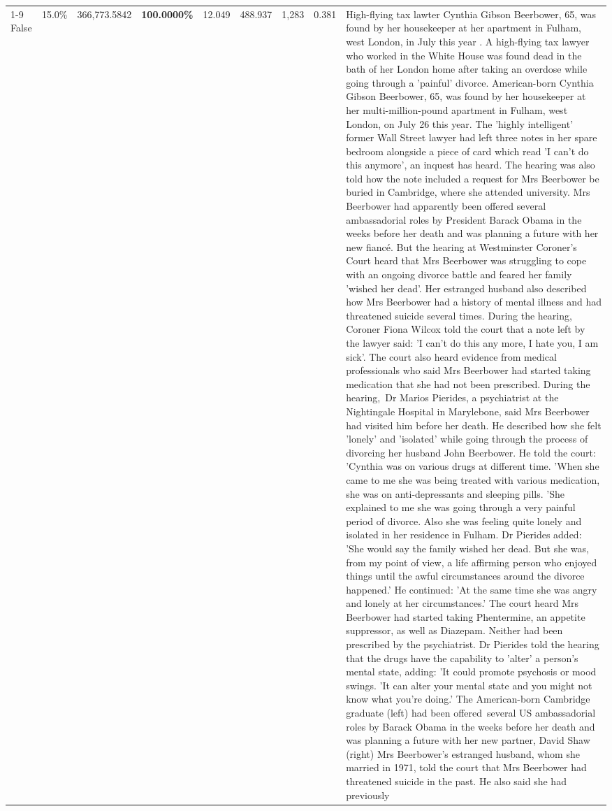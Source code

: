 \begin{table}[H]
\begin{tabular}{lllrlllll}
\cline{1-9}
False & 15.0\% & 366,773.5842 & \bfseries \color{red} 100.0000\% & 12.049 & 488.937 & 1,283 & 0.381 & High-flying tax lawter Cynthia Gibson Beerbower, 65, was found by her housekeeper at her apartment in Fulham, west London, in July this year . A high-flying tax lawyer who worked in the White House was found dead in the bath of her London home after taking an overdose while going through a 'painful' divorce. American-born Cynthia Gibson Beerbower, 65, was found by her housekeeper at her multi-million-pound apartment in Fulham, west London, on July 26 this year. The 'highly intelligent' former Wall Street lawyer had left three notes in her spare bedroom alongside a piece of card which read 'I can't do this anymore', an inquest has heard. The hearing was also told how the note included a request for Mrs Beerbower be buried in Cambridge, where she attended university. Mrs Beerbower had apparently been offered several ambassadorial roles by President Barack Obama in the weeks before her death and was planning a future with her new fiancé. But the hearing at Westminster Coroner's Court heard that Mrs Beerbower was struggling to cope with an ongoing divorce battle and feared her family 'wished her dead'. Her estranged husband also described how Mrs Beerbower had a history of mental illness and had threatened suicide several times. During the hearing, Coroner Fiona Wilcox told the court that a note left by the lawyer said: 'I can't do this any more, I hate you, I am sick'. The court also heard evidence from medical professionals who said Mrs Beerbower had started taking medication that she had not been prescribed. During the hearing, Dr Marios Pierides, a psychiatrist at the Nightingale Hospital in Marylebone, said Mrs Beerbower had visited him before her death. He described how she felt 'lonely' and 'isolated' while going through the process of divorcing her husband John Beerbower. He told the court: 'Cynthia was on various drugs at different time. 'When she came to me she was being treated with various medication, she was on anti-depressants and sleeping pills. 'She explained to me she was going through a very painful period of divorce. Also she was feeling quite lonely and isolated in her residence in Fulham. Dr Pierides added: 'She would say the family wished her dead. But she was, from my point of view, a life affirming person who enjoyed things until the awful circumstances around the divorce happened.' He continued: 'At the same time she was angry and lonely at her circumstances.' The court heard Mrs Beerbower had started taking Phentermine, an appetite suppressor, as well as Diazepam. Neither had been prescribed by the psychiatrist. Dr Pierides told the hearing that the drugs have the capability to 'alter' a person's mental state, adding: 'It could promote psychosis or mood swings. 'It can alter your mental state and you might not know what you're doing.' The American-born Cambridge graduate (left) had been offered several US ambassadorial roles by Barack Obama in the weeks before her death and was planning a future with her new partner, David Shaw (right) Mrs Beerbower's estranged husband, whom she married in 1971, told the court that Mrs Beerbower had threatened suicide in the past. He also said she had previously 
\end{tabular}
\end{table}
